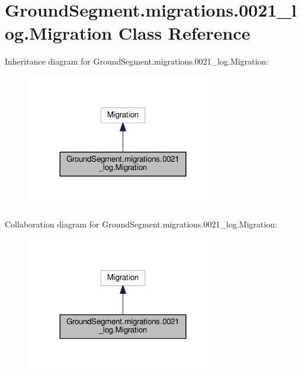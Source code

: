 \hypertarget{class_ground_segment_1_1migrations_1_10021__log_1_1_migration}{}\section{Ground\+Segment.\+migrations.0021\+\_\+log.Migration Class Reference}
\label{class_ground_segment_1_1migrations_1_10021__log_1_1_migration}


Inheritance diagram for Ground\+Segment.\+migrations.0021\+\_\+log.Migration\+:\nopagebreak
\begin{figure}[H]
\begin{center}
\leavevmode
\includegraphics[width=239pt]{class_ground_segment_1_1migrations_1_10021__log_1_1_migration__inherit__graph}
\end{center}
\end{figure}


Collaboration diagram for Ground\+Segment.\+migrations.0021\+\_\+log.Migration\+:\nopagebreak
\begin{figure}[H]
\begin{center}
\leavevmode
\includegraphics[width=239pt]{class_ground_segment_1_1migrations_1_10021__log_1_1_migration__coll__graph}
\end{center}
\end{figure}
